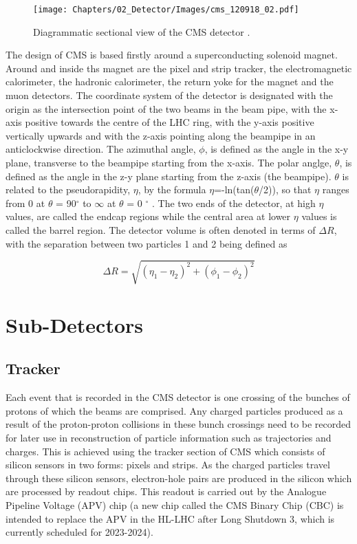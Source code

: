 \begin{figure}[hbtp]
   \centering
     \texttt{[image: Chapters/02\_Detector/Images/cms\_120918\_02.pdf]}\hfill
     \caption[Diagrammatic sectional view of the CMS detector.]{Diagrammatic sectional view of the CMS
     detector
     \cite{Sakuma_sketchup}.}
     \label{fig:CMS_diagram}
 \end{figure}

The design of CMS is based firstly around a superconducting solenoid magnet. Around and inside ths magnet are
the pixel and strip tracker, the electromagnetic calorimeter, the hadronic calorimeter, the return yoke for
the magnet and the muon detectors. The coordinate system of the detector is designated with the origin as the
intersection point of the two beams in the beam pipe, with the x-axis positive towards the centre of the LHC
ring, with the y-axis positive vertically upwards and with the z-axis pointing along the beampipe in an
anticlockwise direction. The azimuthal angle, $\phi$, is defined as the angle in the x-y plane, transverse to
the beampipe starting from the x-axis. The polar anglge, $\theta$, is defined as the angle in the z-y plane
starting from the z-axis (the beampipe). $\theta$ is related to the pseudorapidity, $\eta$, by the formula
$\eta$=-ln(tan($\theta$/2)), so that $\eta$ ranges from 0 at $\theta$ = 90$^{\circ}$ to $\infty$ at $\theta$ =
0 $^{\circ}$ \cite{CMS_TDR1}. The two ends of the detector, at high $\eta$ values, are called the endcap
regions while the central area at lower $\eta$ values is called the barrel region. The detector volume is
often denoted in terms of $\Delta R$, with the separation between two particles 1 and 2 being defined as

\begin{equation}
\Delta R = \sqrt{(\eta_{1} - \eta_{2})^{2} + (\phi_{1} - \phi_{2})^{2}}
\end{equation}

\section{Sub-Detectors}
\label{s:Subdetectors}

\subsection{Tracker}
\label{ss:Tracker}

Each event that is recorded in the CMS detector is one crossing of the bunches of protons of which the beams
are comprised. Any charged particles produced as a result of the proton-proton collisions in these bunch
crossings need to be recorded for later use in reconstruction of particle information such as trajectories and
charges. This is achieved using the tracker section of CMS which consists of silicon sensors in two forms:
pixels and strips. As the charged particles travel through these silicon sensors, electron-hole pairs are
produced in the silicon which are processed by readout chips. This readout is carried out by the
Analogue Pipeline Voltage (APV) chip (a new chip called the CMS Binary Chip (CBC) is intended to replace
the APV in the HL-LHC after Long Shutdown 3, which is currently scheduled for 2023-2024).

